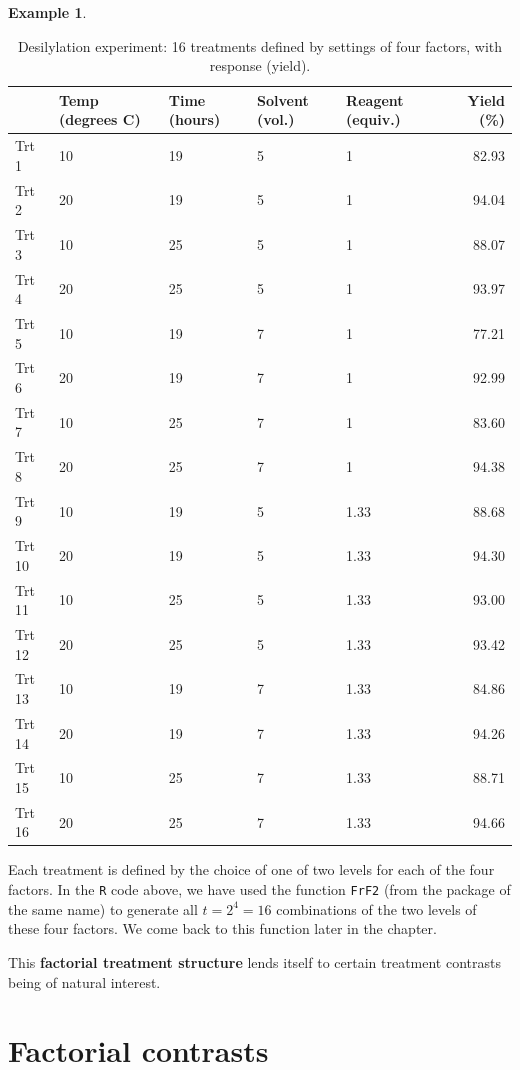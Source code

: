 \documentclass[
]{book}
\theoremstyle{definition}
\theoremstyle{definition}
\newtheorem{example}{Example}[chapter]
\theoremstyle{definition}
\theoremstyle{definition}
\theoremstyle{remark}
\begin{document}
\begin{example}
\begin{table}

\caption{\label{tab:factorial-desilylation-data}Desilylation experiment: 16 treatments defined 
             by settings of four factors, with response (yield).}
\centering
\begin{tabular}[t]{l|l|l|l|l|r}
\hline
  & Temp (degrees C) & Time (hours) & Solvent (vol.) & Reagent (equiv.) & Yield (\%)\\
\hline
Trt 1 & 10 & 19 & 5 & 1 & 82.93\\
\hline
Trt 2 & 20 & 19 & 5 & 1 & 94.04\\
\hline
Trt 3 & 10 & 25 & 5 & 1 & 88.07\\
\hline
Trt 4 & 20 & 25 & 5 & 1 & 93.97\\
\hline
Trt 5 & 10 & 19 & 7 & 1 & 77.21\\
\hline
Trt 6 & 20 & 19 & 7 & 1 & 92.99\\
\hline
Trt 7 & 10 & 25 & 7 & 1 & 83.60\\
\hline
Trt 8 & 20 & 25 & 7 & 1 & 94.38\\
\hline
Trt 9 & 10 & 19 & 5 & 1.33 & 88.68\\
\hline
Trt 10 & 20 & 19 & 5 & 1.33 & 94.30\\
\hline
Trt 11 & 10 & 25 & 5 & 1.33 & 93.00\\
\hline
Trt 12 & 20 & 25 & 5 & 1.33 & 93.42\\
\hline
Trt 13 & 10 & 19 & 7 & 1.33 & 84.86\\
\hline
Trt 14 & 20 & 19 & 7 & 1.33 & 94.26\\
\hline
Trt 15 & 10 & 25 & 7 & 1.33 & 88.71\\
\hline
Trt 16 & 20 & 25 & 7 & 1.33 & 94.66\\
\hline
\end{tabular}
\end{table}

Each treatment is defined by the choice of one of two levels for each of the four factors. In the \texttt{R} code above, we have used the function \texttt{FrF2} (from the package of the same name) to generate all \(t = 2^4 = 16\) combinations of the two levels of these four factors. We come back to this function later in the chapter.

\end{example}

This \textbf{factorial treatment structure} lends itself to certain treatment contrasts being of natural interest.

\hypertarget{factorial-contrasts}{%
\section{Factorial contrasts}\label{factorial-contrasts}}
\end{document}
